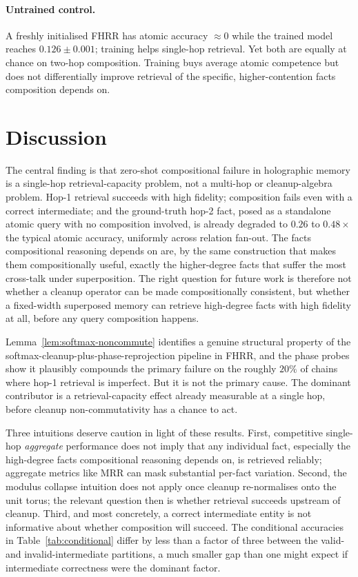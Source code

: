 \documentclass[11pt]{article}
\theoremstyle{definition}
\begin{document}
\paragraph{Untrained control.}
A freshly initialised FHRR has atomic accuracy $\approx 0$ while the trained
model reaches $0.126 \pm 0.001$; training helps single-hop retrieval. Yet both
are equally at chance on two-hop composition. Training buys average atomic
competence but does not differentially improve retrieval of the specific,
higher-contention facts composition depends on.

\section{Discussion}
\label{sec:discussion}

The central finding is that zero-shot compositional failure in holographic
memory is a single-hop retrieval-capacity problem, not a multi-hop or
cleanup-algebra problem. Hop-1 retrieval succeeds with high fidelity; composition
fails even with a correct intermediate; and the ground-truth hop-2 fact, posed
as a standalone atomic query with no composition involved, is already degraded
to $0.26$ to $0.48\times$ the typical atomic accuracy, uniformly across relation
fan-out. The facts compositional reasoning depends on are, by the same construction
that makes them compositionally useful, exactly the higher-degree facts that
suffer the most cross-talk under superposition. The right question for future
work is therefore not whether a cleanup operator can be made compositionally
consistent, but whether a fixed-width superposed memory can retrieve
high-degree facts with high fidelity at all, before any query composition happens.

Lemma~\ref{lem:softmax-noncommute} identifies a genuine structural property of
the softmax-cleanup-plus-phase-reprojection pipeline in FHRR, and the phase
probes show it plausibly compounds the primary failure on the roughly $20\%$ of
chains where hop-1 retrieval is imperfect. But it is not the primary cause. The
dominant contributor is a retrieval-capacity effect already measurable at a
single hop, before cleanup non-commutativity has a chance to act.

Three intuitions deserve caution in light of these results. First, competitive
single-hop \emph{aggregate} performance does not imply that any individual
fact, especially the high-degree facts compositional reasoning depends on, is
retrieved reliably; aggregate metrics like MRR can mask substantial per-fact
variation. Second, the modulus collapse intuition does not apply once cleanup
re-normalises onto the unit torus; the relevant question then is whether
retrieval succeeds upstream of cleanup. Third, and most concretely, a correct
intermediate entity is not informative about whether composition will succeed.
The conditional accuracies in Table~\ref{tab:conditional} differ by less than a
factor of three between the valid- and invalid-intermediate partitions, a much
smaller gap than one might expect if intermediate correctness were the dominant
factor.
\end{document}
